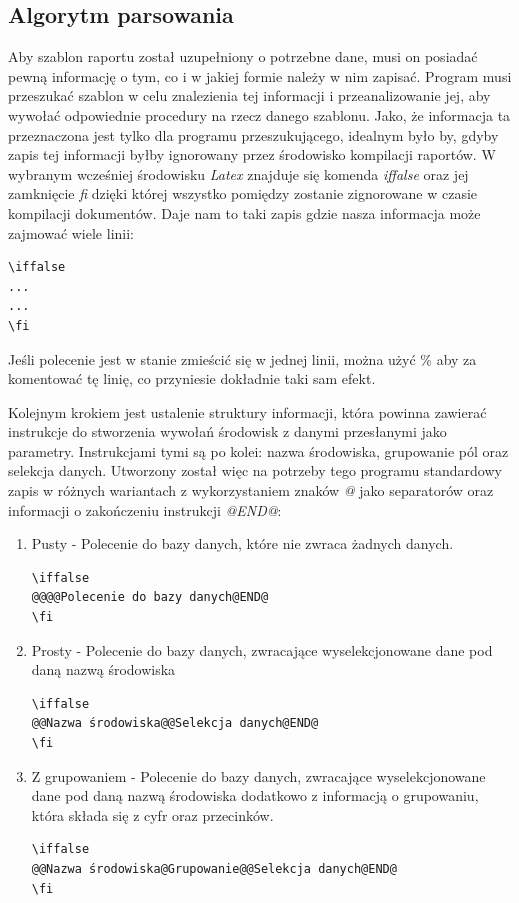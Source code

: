 \subsection{Algorytm parsowania}
Aby szablon raportu został uzupełniony o potrzebne dane, musi on posiadać pewną informację o tym, co i w jakiej formie należy w nim zapisać.  Program musi przeszukać szablon w celu znalezienia tej informacji i przeanalizowanie jej, aby wywołać odpowiednie procedury na rzecz danego szablonu. Jako, że informacja ta przeznaczona jest tylko dla programu przeszukującego, idealnym było by, gdyby zapis tej informacji byłby ignorowany przez środowisko kompilacji raportów.  W wybranym wcześniej środowisku \emph{Latex} znajduje się komenda \emph{iffalse} oraz jej zamknięcie \emph{fi} dzięki której wszystko pomiędzy zostanie zignorowane w czasie kompilacji dokumentów. Daje nam to taki zapis gdzie nasza informacja może zajmować wiele linii:
\begin{lstlisting}
\iffalse 
...
...
\fi
\end{lstlisting}
Jeśli polecenie jest w stanie zmieścić się w jednej linii, można użyć \% aby za komentować tę linię, co przyniesie dokładnie taki sam efekt.
\par
Kolejnym krokiem jest ustalenie struktury informacji, która powinna zawierać instrukcje do stworzenia wywołań środowisk z danymi przesłanymi jako parametry. Instrukcjami tymi są po kolei: nazwa środowiska, grupowanie pól oraz selekcja danych. Utworzony został więc na potrzeby tego programu standardowy zapis w różnych wariantach z wykorzystaniem znaków \emph{@} jako separatorów oraz informacji o zakończeniu instrukcji \emph{@END@}:\vspace{5mm}
\begin{enumerate}
\item Pusty - Polecenie do bazy danych, które nie zwraca żadnych danych.
\begin{lstlisting}
\iffalse 
@@@@Polecenie do bazy danych@END@
\fi
\end{lstlisting}

\item Prosty - Polecenie do bazy danych, zwracające wyselekcjonowane dane pod daną nazwą środowiska
\begin{lstlisting}
\iffalse 
@@Nazwa środowiska@@Selekcja danych@END@
\fi
\end{lstlisting}

\item Z grupowaniem - Polecenie do bazy danych, zwracające wyselekcjonowane dane pod daną nazwą środowiska dodatkowo z informacją o grupowaniu, która składa się z cyfr oraz przecinków.
\begin{lstlisting}
\iffalse 
@@Nazwa środowiska@Grupowanie@@Selekcja danych@END@
\fi
\end{lstlisting}
\end{enumerate}

